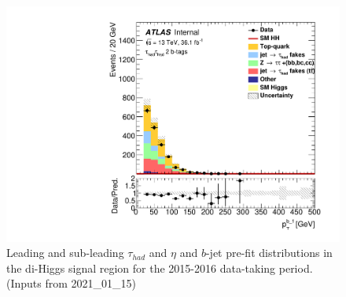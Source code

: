 \begin{figure}
\includegraphics[width=.45\textwidth]{figures/selection/HadHad_HH/Plots2015/Region_BMin0_incJet1_distJet1Pt_J2_Y2015_DLLOS_T2_SpcTauHH_L0_Prefit.pdf}
\caption{Leading and sub-leading $\tau_{had}$ \pt and $\eta$ and $b$-jet \pt pre-fit
  distributions in the di-Higgs \hadhad signal region for the 2015-2016 data-taking period. (Inputs from 2021\_01\_15)}
\label{fig:HadHadPreselectionPtDistributions2015}
\end{figure}

